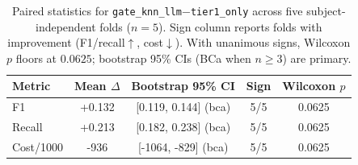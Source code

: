 \begin{table}[!t]
\centering
\caption{Paired statistics for \texttt{gate\_knn\_llm}$-$\texttt{tier1\_only} across five subject-independent folds ($n{=}5$). Sign column reports folds with improvement (F1/recall$\uparrow$, cost$\downarrow$). With unanimous signs, Wilcoxon $p$ floors at $0.0625$; bootstrap 95\% CIs (BCa when $n{\ge}3$) are primary.}
\label{tab:stats}
\begin{tabular}{lcccc}
\toprule
Metric & Mean $\Delta$ & Bootstrap 95\% CI & Sign & Wilcoxon $p$ \\
\midrule
F1 & +0.132 & [0.119, 0.144] (bca) & 5/5 & 0.0625 \\
Recall & +0.213 & [0.182, 0.238] (bca) & 5/5 & 0.0625 \\
Cost/1000 & -936 & [-1064, -829] (bca) & 5/5 & 0.0625 \\
\bottomrule
\end{tabular}
\end{table}

